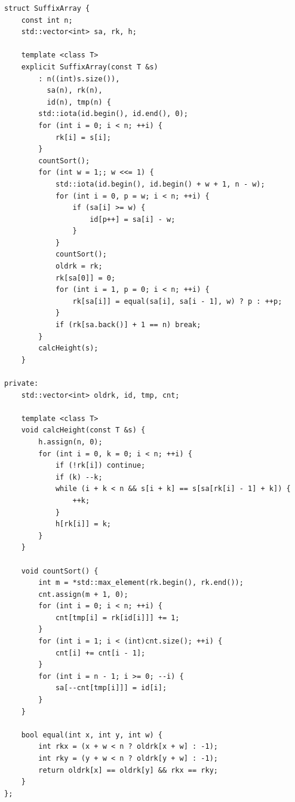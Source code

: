     \begin{lstlisting}
struct SuffixArray {
    const int n;
    std::vector<int> sa, rk, h;

    template <class T>
    explicit SuffixArray(const T &s)
        : n((int)s.size()),
          sa(n), rk(n),
          id(n), tmp(n) {
        std::iota(id.begin(), id.end(), 0);
        for (int i = 0; i < n; ++i) {
            rk[i] = s[i];
        }
        countSort();
        for (int w = 1;; w <<= 1) {
            std::iota(id.begin(), id.begin() + w + 1, n - w);
            for (int i = 0, p = w; i < n; ++i) {
                if (sa[i] >= w) {
                    id[p++] = sa[i] - w;
                }
            }
            countSort();
            oldrk = rk;
            rk[sa[0]] = 0;
            for (int i = 1, p = 0; i < n; ++i) {
                rk[sa[i]] = equal(sa[i], sa[i - 1], w) ? p : ++p;
            }
            if (rk[sa.back()] + 1 == n) break;
        }
        calcHeight(s);
    }

private:
    std::vector<int> oldrk, id, tmp, cnt;

    template <class T>
    void calcHeight(const T &s) {
        h.assign(n, 0);
        for (int i = 0, k = 0; i < n; ++i) {
            if (!rk[i]) continue;
            if (k) --k;
            while (i + k < n && s[i + k] == s[sa[rk[i] - 1] + k]) {
                ++k;
            }
            h[rk[i]] = k;
        }
    }

    void countSort() {
        int m = *std::max_element(rk.begin(), rk.end());
        cnt.assign(m + 1, 0);
        for (int i = 0; i < n; ++i) {
            cnt[tmp[i] = rk[id[i]]] += 1;
        }
        for (int i = 1; i < (int)cnt.size(); ++i) {
            cnt[i] += cnt[i - 1];
        }
        for (int i = n - 1; i >= 0; --i) {
            sa[--cnt[tmp[i]]] = id[i];
        }
    }

    bool equal(int x, int y, int w) {
        int rkx = (x + w < n ? oldrk[x + w] : -1);
        int rky = (y + w < n ? oldrk[y + w] : -1);
        return oldrk[x] == oldrk[y] && rkx == rky;
    }
};
    \end{lstlisting}

